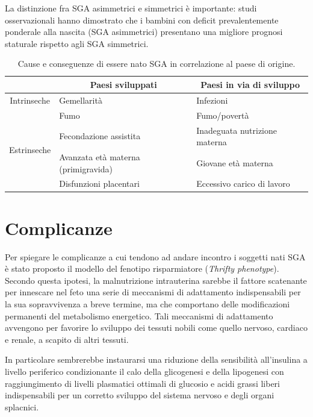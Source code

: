 La distinzione fra SGA asimmetrici e simmetrici \`e importante: studi osservazionali 
hanno dimostrato che i bambini con deficit prevalentemente ponderale alla nascita 
(SGA asimmetrici) presentano una migliore prognosi staturale rispetto agli SGA simmetrici.\cite{sga-10}

\begin{table}[h]\centering
\begin{tabular}{cll}
\toprule
			& \multicolumn{1}{c}{Paesi sviluppati}			& \multicolumn{1}{c}{Paesi in via di sviluppo} \\
\midrule
Intrinseche & Gemellarit\`a 			& Infezioni			\\\midrule
\multirow{4}{*}{Estrinseche} & Fumo						& Fumo/povertà		\\\cmidrule(l){2-3}
			& Fecondazione assistita	& Inadeguata nutrizione materna	\\\cmidrule(l){2-3}
			& Avanzata età materna (primigravida) &	Giovane età materna \\\cmidrule(l){2-3}
			& Disfunzioni placentari	& Eccessivo carico di lavoro	\\\bottomrule
\end{tabular}
\label{tab-cause}
\caption{Cause e conseguenze di essere nato SGA in correlazione al paese di origine.}
\end{table}

  

\section{Complicanze}


Per spiegare le complicanze a cui tendono ad andare incontro i soggetti nati SGA è stato proposto il modello del fenotipo risparmiatore (\textit{Thrifty phenotype}).
Secondo questa ipotesi, la malnutrizione intrauterina sarebbe il fattore scatenante
per innescare nel feto una serie di meccanismi di adattamento indispensabili per 
la sua sopravvivenza a breve termine, ma che comportano delle modificazioni permanenti
del metabolismo energetico.
Tali meccanismi di adattamento avvengono per favorire lo sviluppo dei tessuti 
nobili come quello nervoso, cardiaco e renale, a scapito di altri tessuti.

In particolare sembrerebbe instaurarsi una riduzione della sensibilità all'insulina
a livello periferico condizionante il calo della glicogenesi e della lipogenesi
con raggiungimento di livelli plasmatici ottimali di glucosio e acidi grassi liberi
indispensabili per un corretto sviluppo del sistema nervoso e degli organi splacnici.\cite{sga-51}



